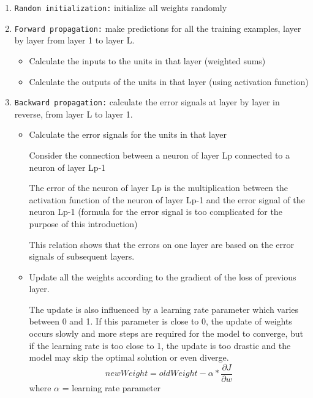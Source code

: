 \documentclass[a4paper,10pt]{article}
\begin{document}
 
 \begin{enumerate}
 	\item \texttt{Random initialization:} initialize all weights randomly
 	\item \texttt{Forward propagation:} make predictions for all the training examples, layer by layer from layer 1 to layer L. 
 	\begin{itemize}
 		\item Calculate the inputs to the units in that layer (weighted sums)
 		\item Calculate the outputs of the units in that layer (using activation function)
 	\end{itemize}
 
	\item \texttt{Backward propagation:} calculate the error signals at layer by layer in reverse, from layer L to layer 1.
		\begin{itemize}
		\item Calculate the error signals for the units in that layer
		
		\quad \quad Consider the connection between a neuron of layer Lp connected to a neuron of layer Lp-1
		
		\quad The error of the neuron of layer Lp is the multiplication between the activation function of the neuron of layer Lp-1 and the error signal of the neuron Lp-1 (formula for the error signal is too complicated for the purpose of this introduction)
		
		\quad This relation shows that the errors on one layer are based on the error signals of subsequent layers. 
		  
		\item Update all the weights according to the gradient of the loss of previous layer. 
		
		\quad The update is also influenced by a learning rate parameter which varies between 0 and 1. If this parameter is close to 0, the update of weights occurs slowly and more steps are required for the model to converge, but if the learning rate is too close to 1, the update is too drastic and the model may skip the optimal solution or even diverge. 
		 $$ newWeight = oldWeight - \alpha *\frac{\partial J}{\partial w} $$
		 where $\alpha$ = learning rate parameter
		
		\end{itemize}
  \end{enumerate}
 
 \vspace{5mm} %
 
\end{document}

